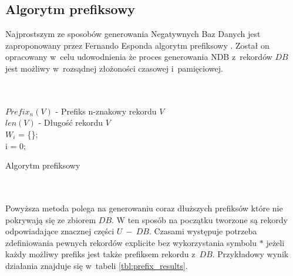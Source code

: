 \subsection{Algorytm prefiksowy}
\label{sec:prefix-alg}
Najprostszym ze sposobów generowania Negatywnych Baz Danych jest zaproponowany przez Fernando Esponda 
algorytm prefiksowy \cite{NRI-Esponda, Esponda2004EnhancingPT}. Został on opracowany w~celu udowodnienia
że proces generowania NDB z~rekordów $DB$ jest możliwy w~rozsądnej złożoności czasowej i~pamięciowej.
\\\\\\
\begin{algorithm}[H]
    \SetAlgoLined
    $Prefix_n(V)$ - Prefiks n-znakowy rekordu $V$\\
    $len(V)$ - Długość rekordu $V$\\
    $W_i$ = \{\};\\
    i = 0;\\
    
    \caption{Algorytm prefiksowy}
    \label{alg:prefix}
\end{algorithm}
~\\\\


Powyższa metoda polega na generowaniu coraz dłuższych prefiksów które nie pokrywają się ze zbiorem $DB$.
W ten sposób na początku tworzone są rekordy odpowiadające znacznej części $U~-~DB$. Czasami występuje potrzeba zdefiniowania pewnych rekordów explicite bez wykorzystania symbolu $*$ jeżeli każdy możliwy prefiks jest także prefiksem rekordu z~$DB$. 
Przykładowy wynik działania znajduje się w~tabeli \ref{tbl:prefix_results}.

